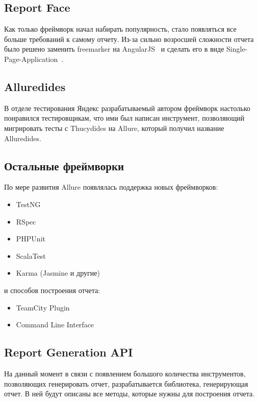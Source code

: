 \subsection{Report Face}

Как только фреймворк начал набирать популярность, стало появляться все больше требований к самому отчету. Из-за сильно возросшей сложности отчета было решено заменить freemarker на AngularJS~\cite{angularjs_home} и сделать его в виде Single-Page-Application~\cite{spa}. 

\subsection{Alluredides}

В отделе тестирования Яндекс разрабатываемый автором фреймворк настолько понравился тестировщикам, что ими был написан инструмент, позволяющий мигрировать тесты с Thucydides на Allure, который получил название Alluredides.

\subsection{Остальные фреймворки}

По мере развития Allure появлялась поддержка новых фреймворков:

\begin{itemize}
\item TestNG
\item RSpec
\item PHPUnit
\item ScalaTest
\item Karma (Jasmine и другие)
\end{itemize}

и способов построения отчета:

\begin{itemize}
\item TeamCity Plugin
\item Command Line Interface
\end{itemize}

\subsection{Report Generation API}

На данный момент в связи с появлением большого количества инструментов, позволяющих генерировать отчет, разрабатывается библиотека, генерирующая отчет. В ней будут описаны все методы, которые нужны для построения отчета. 

